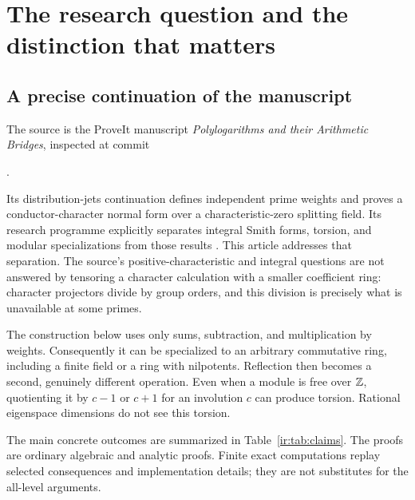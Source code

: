 \section{The research question and the distinction that matters}
\label{ir:sec:scope}

\subsection{A precise continuation of the manuscript}
The source is the ProveIt manuscript \emph{Polylogarithms and their
Arithmetic Bridges}, inspected at commit
\begin{center}.\end{center}
Its distribution-jets continuation defines independent prime weights and
proves a conductor-character normal form over a characteristic-zero
splitting field. Its research programme explicitly separates integral
Smith forms, torsion, and modular specializations from those results
\cite{repo,distribution-report}. This article addresses that separation.
The source's positive-characteristic and integral questions are not answered
by tensoring a character calculation with a smaller coefficient ring:
character projectors divide by group orders, and this division is precisely
what is unavailable at some primes.

The construction below uses only sums, subtraction, and multiplication by
weights. Consequently it can be specialized to an arbitrary commutative
ring, including a finite field or a ring with nilpotents. Reflection then
becomes a second, genuinely different operation. Even when a module is
free over $\mathbb Z$, quotienting it by $c-1$ or $c+1$ for an involution $c$ can
produce torsion. Rational eigenspace dimensions do not see this torsion.

The main concrete outcomes are summarized in Table~\ref{ir:tab:claims}.
The proofs are ordinary algebraic and analytic proofs. Finite exact
computations replay selected consequences and implementation details;
they are not substitutes for the all-level arguments.

